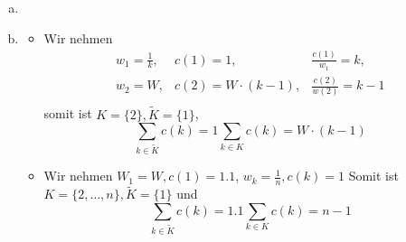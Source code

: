 \documentclass{article}
\begin{document}
\begin{enumerate}[a)]
            Sei eine Lösung $K'\in [0,1]^{n+1}\neq K$ optimal, bei der wir nur ein Element aus $K$, an der stelle $j$
            (anteilig) ersetzen.
            So gilt
            \begin{align*}
                \sum_i c(i)&<\sum_i c(i)K_i\\
                (1-K_j)\cdot c(j)&<\sum_{i=k+2}^n c(i)K_i
            \end{align*}
            Wir wissen, dass $\sum_{i}w_i=\sum_{i}w_i K_i$.
            Es ist also
            \begin{align*}
                (1-K_j)\cdot c(j)&<(1-K_j)c(k+2)
            \end{align*}
            Da aber $j<k+2$ ist dies Ein Widerspruch, es gibt keine bessere Lösung, bei der nur ein ELement aus $K$ entnommen wird.
            Für $k=n+1$ entnehme zunächst die Differenz für $n$ gegenstände, dann gibt es einen neuen Rucksack mit angepasstem $W$.
            Nun entnehme genau ein Element.
        \item
        \item
            \begin{itemize}
                \item
                    Wir nehmen
                    \begin{align*}
                        w_1=\frac{1}{k},&c(1)=1,&\frac{c(1)}{w_1}=k,\\
                        w_2=W,&c(2)=W\cdot(k-1),&\frac{c(2)}{w(2)}=k-1\\
                    \end{align*}
                    somit ist $K=\{2\},\tilde{K}=\{1\}$,
                    \begin{equation*}
                        \sum_{k\in\tilde{K}}c(k)=1
                        \sum_{k\in K}c(k)=W\cdot (k-1)
                    \end{equation*}
                \item
                    Wir nehmen $W_1=W,c(1)=1.1$, $w_k=\frac{1}{n},c(k)=1$
                    Somit ist $K=\{2,\hdots,n\},\tilde{K}=\{1\}$ und
                    \begin{equation*}
                        \sum_{k\in\tilde{K}}c(k)=1.1
                        \sum_{k\in K}c(k)=n-1
                    \end{equation*}
            \end{itemize}
    \end{enumerate}
\end{document}
